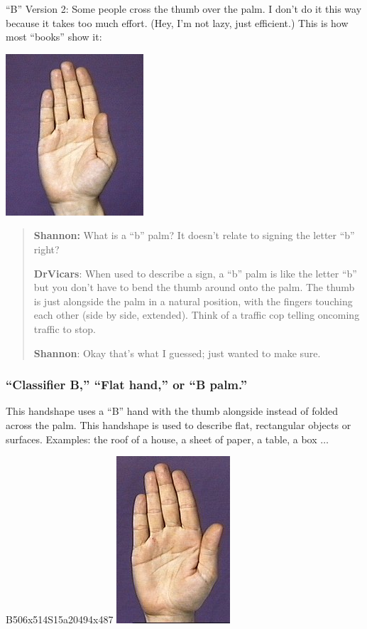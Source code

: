 \documentclass{article}
\begin{document}
``B'' Version 2:
Some people cross the thumb over the palm.
I don't do it this way because it takes too much effort.
(Hey, I'm not lazy, just efficient.)
This is how most ``books'' show it:

\includegraphics[scale=0.5]{images/b1.jpg}

\begin{quote}
\textbf{Shannon:}
What is a ``b'' palm?
It doesn't relate to signing the letter ``b'' right?

\textbf{DrVicars}:
When used to describe a sign, a ``b'' palm is like the letter ``b'' but you don't have to bend the thumb around onto the palm.
The thumb is just alongside the palm in a natural position, with the fingers touching each other (side by side, extended).
Think of a traffic cop telling oncoming traffic to stop.

\textbf{Shannon}:
Okay that's what I guessed; just wanted to make sure.
\end{quote}

\subsubsection{``Classifier B,'' ``Flat hand,'' or ``B palm.''}

This handshape uses a ``B'' hand with the thumb alongside instead of folded across the palm.
This handshape is used to describe flat, rectangular objects or surfaces.
Examples:
the roof of a house, a sheet of paper, a table, a box $\ldots$

B506x514S15a20494x487
\includegraphics[scale=0.5]{images/flat.jpg}
\end{document}
